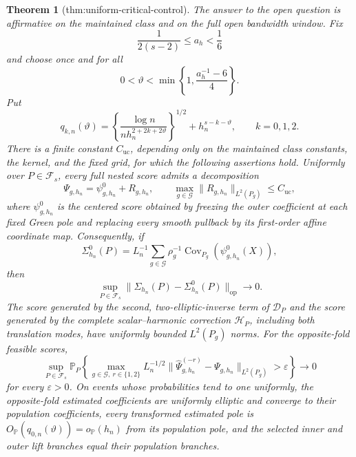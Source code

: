 \documentclass{article}
\newtheorem{theorem}{Theorem}
\begin{document}
\begin{theorem}[thm:uniform-critical-control]\label{thm:uniform-critical-control}
The answer to the open question is affirmative on the maintained class and on the full open bandwidth window.  Fix
\[
 \frac{1}{2(s-2)}\leq a_h<\frac16
\]
and choose once and for all
\[
 0<\vartheta<\min\left\{1,\frac{a_h^{-1}-6}{4}\right\}.
\]
Put
\[
 q_{k,n}(\vartheta)=
 \left\{\frac{\log n}{n h_n^{2+2k+2\vartheta}}\right\}^{1/2}
 +h_n^{s-k-\vartheta},\qquad k=0,1,2.
\]
There is a finite constant \(C_{\mathrm{uc}}\), depending only on the maintained class constants, the kernel, and the fixed grid, for which the following assertions hold.
Uniformly over \(P\in\mathcal F_s\), every full nested score admits a decomposition
\[
 \Psi_{g,h_n}=\psi^0_{g,h_n}+R_{g,h_n},
 \qquad
 \max_{g\in\mathcal G}\lVert R_{g,h_n}\rVert_{L^2(P_g)}\leq C_{\mathrm{uc}},
\]
where \(\psi^0_{g,h_n}\) is the centered score obtained by freezing the outer coefficient at each fixed Green pole and replacing every smooth pullback by its first-order affine coordinate map.  Consequently, if
\[
 \Sigma^0_{h_n}(P)=L_n^{-1}
 \sum_{g\in\mathcal G}\rho_g^{-1}
 \operatorname{Cov}_{P_g}(\psi^0_{g,h_n}(X)),
\]
then
\[
 \sup_{P\in\mathcal F_s}
 \lVert\Sigma_{h_n}(P)-\Sigma^0_{h_n}(P)\rVert_{\mathrm{op}}
 \longrightarrow0.
\]
The score generated by the second, two-elliptic-inverse term of \(\mathcal D_P\) and the score generated by the complete scalar--harmonic correction \(\mathcal H_P\), including both translation modes, have uniformly bounded \(L^2(P_g)\) norms.  For the opposite-fold feasible scores,
\[
 \sup_{P\in\mathcal F_s}\mathbb P_P\!\left\{
 \max_{g\in\mathcal G,\ r\in\{1,2\}}
 L_n^{-1/2}
 \lVert\widehat\Psi_{g,h_n}^{(-r)}-\Psi_{g,h_n}\rVert_{L^2(P_g)}
 >\varepsilon\right\}\longrightarrow0
\]
for every \(\varepsilon>0\).  On events whose probabilities tend to one uniformly, the opposite-fold estimated coefficients are uniformly elliptic and converge to their population coefficients, every transformed estimated pole is \(O_{\mathbb P}(q_{0,n}(\vartheta))=o_{\mathbb P}(h_n)\) from its population pole, and the selected inner and outer lift branches equal their population branches.


\end{theorem}
\end{document}
